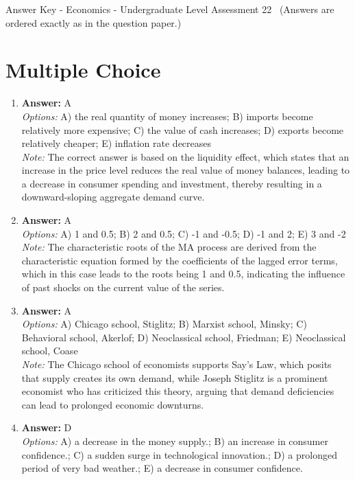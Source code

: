 \documentclass[12pt]{article}
\begin{document}
\begin{center}
Answer Key - Economics - Undergraduate Level Assessment 22 \
\small (Answers are ordered exactly as in the question paper.)
\end{center}

\section*{Multiple Choice}
\begin{enumerate}[label=\arabic*.]
\item \textbf{Answer:} A
\\ \textit{Options:} A) the real quantity of money increases; B) imports become relatively more expensive; C) the value of cash increases; D) exports become relatively cheaper; E) inflation rate decreases
\\ \textit{Note:} The correct answer is based on the liquidity effect, which states that an increase in the price level reduces the real value of money balances, leading to a decrease in consumer spending and investment, thereby resulting in a downward-sloping aggregate demand curve.
\item \textbf{Answer:} A
\\ \textit{Options:} A) 1 and 0.5; B) 2 and 0.5; C) -1 and -0.5; D) -1 and 2; E) 3 and -2
\\ \textit{Note:} The characteristic roots of the MA process are derived from the characteristic equation formed by the coefficients of the lagged error terms, which in this case leads to the roots being 1 and 0.5, indicating the influence of past shocks on the current value of the series.
\item \textbf{Answer:} A
\\ \textit{Options:} A) Chicago school, Stiglitz; B) Marxist school, Minsky; C) Behavioral school, Akerlof; D) Neoclassical school, Friedman; E) Neoclassical school, Coase
\\ \textit{Note:} The Chicago school of economists supports Say's Law, which posits that supply creates its own demand, while Joseph Stiglitz is a prominent economist who has criticized this theory, arguing that demand deficiencies can lead to prolonged economic downturns.
\item \textbf{Answer:} D
\\ \textit{Options:} A) a decrease in the money supply.; B) an increase in consumer confidence.; C) a sudden surge in technological innovation.; D) a prolonged period of very bad weather.; E) a decrease in consumer confidence.

\end{enumerate}
\end{document}
